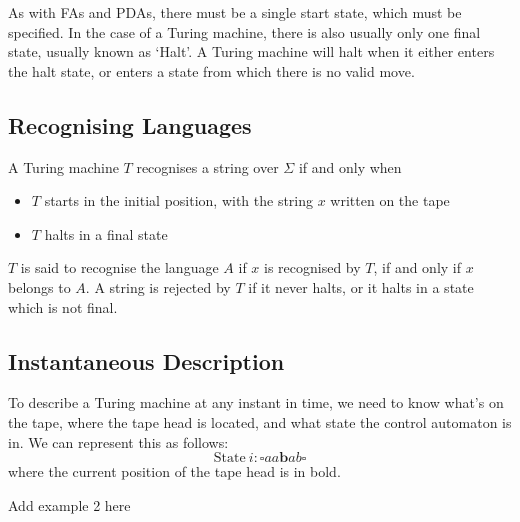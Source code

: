 As with FAs and PDAs, there must be a single start state, which must be specified. In the case of a Turing machine,
 there is also usually only one final state, usually known as `Halt'. A Turing machine will halt when it either enters
 the halt state, or enters a state from which there is no valid move.

\subsection*{Recognising Languages}

A Turing machine $T$ recognises a string over $\Sigma$ if and only when
\begin{itemize}
  \item $T$ starts in the initial position, with the string $x$ written on the tape
  \item $T$ halts in a final state
\end{itemize}

$T$ is said to recognise the language $A$ if $x$ is recognised by $T$, if and only if $x$ belongs to $A$. A string is
 rejected by $T$ if it never halts, or it halts in a state which is not final.

\subsection*{Instantaneous Description}

To describe a Turing machine at any instant in time, we need to know what's on the tape, where the tape head is located,
 and what state the control automaton is in. We can represent this as follows:
\begin{equation*}
  \mathrm{State\ } i: \square a a \textbf{b} a b \square
\end{equation*}
where the current position of the tape head is in bold.

{\Huge Add example 2 here}




